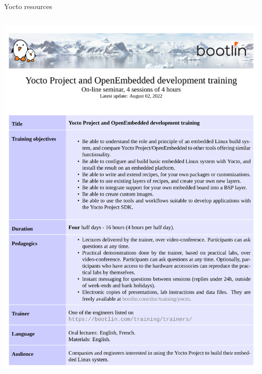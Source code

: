 \begin{frame}{Yocto resources}
\begin{columns}
\begin{center}
      \includegraphics[height=0.4\textheight]{slides/sysdev-build-systems/yp-training.png}
    \end{center}
  \end{columns}
\end{frame}

